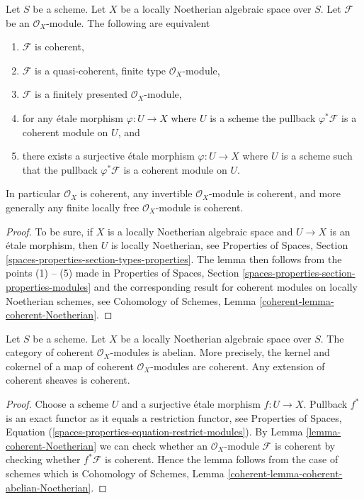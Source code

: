 \begin{lemma}
\label{lemma-coherent-Noetherian}
Let $S$ be a scheme.
Let $X$ be a locally Noetherian algebraic space over $S$.
Let $\mathcal{F}$ be an $\mathcal{O}_X$-module.
The following are equivalent
\begin{enumerate}
\item $\mathcal{F}$ is coherent,
\item $\mathcal{F}$ is a quasi-coherent, finite type $\mathcal{O}_X$-module,
\item $\mathcal{F}$ is a finitely presented $\mathcal{O}_X$-module,
\item for any \'etale morphism $\varphi : U \to X$ where $U$ is a scheme
the pullback $\varphi^*\mathcal{F}$ is a coherent module on $U$, and
\item there exists a surjective \'etale morphism $\varphi : U \to X$
where $U$ is a scheme such that the pullback $\varphi^*\mathcal{F}$ is
a coherent module on $U$.
\end{enumerate}
In particular $\mathcal{O}_X$ is coherent, any invertible
$\mathcal{O}_X$-module is coherent, and more generally any
finite locally free $\mathcal{O}_X$-module is coherent.
\end{lemma}

\begin{proof}
To be sure, if $X$ is a locally Noetherian algebraic space and
$U \to X$ is an \'etale morphism, then $U$ is locally Noetherian, see
Properties of Spaces, Section \ref{spaces-properties-section-types-properties}.
The lemma then follows from the points (1) -- (5) made in
Properties of Spaces, Section \ref{spaces-properties-section-properties-modules}
and the corresponding result for coherent modules on locally
Noetherian schemes, see
Cohomology of Schemes, Lemma \ref{coherent-lemma-coherent-Noetherian}.
\end{proof}

\begin{lemma}
\label{lemma-coherent-abelian-Noetherian}
Let $S$ be a scheme. Let $X$ be a locally Noetherian algebraic space over $S$.
The category of coherent $\mathcal{O}_X$-modules is abelian. More precisely,
the kernel and cokernel of a map of coherent $\mathcal{O}_X$-modules are
coherent. Any extension of coherent sheaves is coherent.
\end{lemma}

\begin{proof}
Choose a scheme $U$ and a surjective \'etale morphism $f : U \to X$.
Pullback $f^*$ is an exact functor as it equals a restriction functor, see
Properties of Spaces, Equation
(\ref{spaces-properties-equation-restrict-modules}).
By
Lemma \ref{lemma-coherent-Noetherian} we can check whether an
$\mathcal{O}_X$-module $\mathcal{F}$ is
coherent by checking whether $f^*\mathcal{F}$ is coherent. Hence the
lemma follows from the case of schemes which is
Cohomology of Schemes, Lemma \ref{coherent-lemma-coherent-abelian-Noetherian}.
\end{proof}


